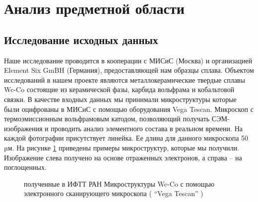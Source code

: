 \documentclass[a4paper, 14pt]{article}
\begin{document}
	\section{Анализ предметной области }
	
	\subsection{Исследование исходных данных}
	Наше исследование проводится в кооперации с МИСиС (Москва) и организацией Element Six GmBH (Германия), предоставляющей нам образцы сплава. Объектом исследований в нашем 		проекте являются металлокерамические твердые сплавы Wc-Co состоящие из керамической фазы, карбида вольфрама и кобальтовой связки. В качестве входных данных мы принимали микроструктуры которые были оцифрованы в МИСиС с помощью оборудования Vega Tescan. Микроскоп с термоэмиссионным вольфрамовым катодом, позволяющий получать СЭМ-изображения и проводить анализ элементного состава в реальном времени. На каждой фотографии присутствует линейка. Ее длина для данного микроскопа 50 µм. На рисунке \ref{original} приведены примеры микроструктур, которые мы получили. Изображение слева получено на основе отраженных электронов, а справа – на поглощенных.
	
	\begin{figure}[h]
		\caption{полученные в ИФТТ РАН Микроструктуры Wc-Co с помощью электронного сканирующего микроскопа ( “Vega Tescan” )}
		\label{original}
	\end{figure}
	
\end{document}
